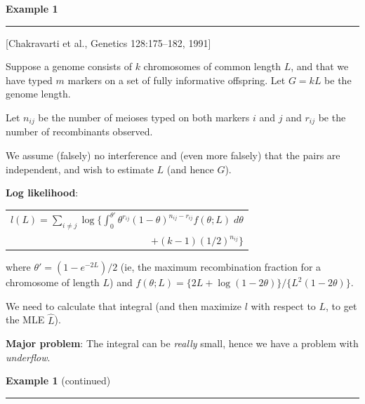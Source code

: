 \documentclass[12pt,letterpaper]{article}
\newcommand{\HRule}{\rule{\linewidth}{4pt}}
\newcommand{\vsphalf}{\vspace*{0.5cm}}
\begin{document}
\newpage

\fontsize{30}{30} \selectfont

\centerline{\textbf{Example 1}}

\HRule

\vsphalf

\fontsize{20}{25} \selectfont

[Chakravarti et al., Genetics 128:175--182, 1991]

\bigskip

Suppose a genome consists of $k$ chromosomes of common length $L$, and
that we have typed $m$ markers on a set of fully informative
offspring.  Let $G = kL$ be the genome length.

\bigskip

Let $n_{ij}$ be the number of meioses typed on both markers $i$ and
$j$ and $r_{ij}$ be the number of recombinants observed.

\bigskip

We assume (falsely) no interference and (even more falsely) that the
pairs are independent, and wish to estimate $L$ (and hence $G$).

\bigskip

\textbf{Log likelihood}:

\begin{center} \begin{tabular}{l}
$l(L) = \sum_{i \ne j} \log \{ \int_{0}^{\theta'} \theta^{r_{ij}}
(1-\theta)^{n_{ij}-r_{ij}} f(\theta; L) \; d\theta $ \\
\multicolumn{1}{r}{$+ (k-1)(1/2)^{n_{ij}} \}$}
\end{tabular} \end{center}

where $\theta' = (1-e^{-2L})/2$ (ie, the maximum recombination
fraction for a chromosome of length $L$) and $f(\theta; L) = \{ 2L +
\log(1-2\theta)\}/\{L^2(1-2\theta)\}$.

\bigskip

We need to calculate that integral (and then maximize $l$ with respect
to $L$, to get the MLE $\hat{L}$).

\bigskip

\textbf{Major problem}: The integral can be \emph{really} small, hence
we have a problem with \emph{underflow}.


\newpage

\fontsize{30}{30} \selectfont

\centerline{\textbf{Example 1} (continued)}

\HRule
\end{document}

